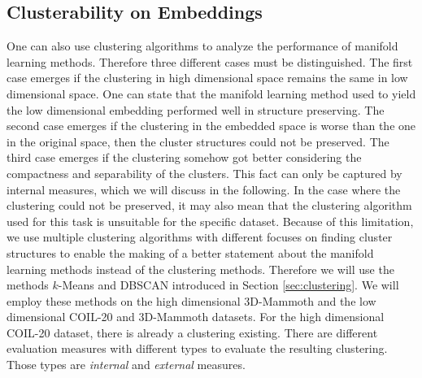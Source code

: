 \subsection{Clusterability on Embeddings} \label{subsec:cluster}

One can also use clustering algorithms to analyze the performance of manifold learning methods. Therefore three different cases must be distinguished. The first case emerges if the clustering in high dimensional space remains the same in low dimensional space. One can state that the manifold learning method used to yield the low dimensional embedding performed well in structure preserving. The second case emerges if the clustering in the embedded space is worse than the one in the original space, then the cluster structures could not be preserved. The third case emerges if the clustering somehow got better considering the compactness and separability of the clusters. This fact can only be captured by internal measures, which we will discuss in the following. In the case where the clustering could not be preserved, it may also mean that the clustering algorithm used for this task is unsuitable for the specific dataset. Because of this limitation, we use multiple clustering algorithms with different focuses on finding cluster structures to enable the making of a better statement about the manifold learning methods instead of the clustering methods. Therefore we will use the methods $k$-Means and DBSCAN introduced in Section \ref{sec:clustering}. We will employ these methods on the high dimensional 3D-Mammoth and the low dimensional COIL-20 and 3D-Mammoth datasets. For the high dimensional COIL-20 dataset, there is already a clustering existing. There are different evaluation measures with different types to evaluate the resulting clustering. Those types are \textit{internal} and \textit{external} measures. \cite{Gisbrecht15}

